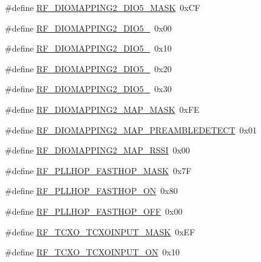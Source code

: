 \begin{DoxyCompactItemize}
\item 
\#define \hyperlink{sx1276Regs-Fsk_8h_a7f2fac07e30561cbe8a856d35592704e}{R\+F\+\_\+\+D\+I\+O\+M\+A\+P\+P\+I\+N\+G2\+\_\+\+D\+I\+O5\+\_\+\+M\+A\+SK}~0x\+CF
\item 
\#define \hyperlink{sx1276Regs-Fsk_8h_a49d9e03aef7b56e4772c7af5f55822b2}{R\+F\+\_\+\+D\+I\+O\+M\+A\+P\+P\+I\+N\+G2\+\_\+\+D\+I\+O5\+\_}~0x00
\item 
\#define \hyperlink{sx1276Regs-Fsk_8h_a3fa8da47f99319005e509c21a50e48b0}{R\+F\+\_\+\+D\+I\+O\+M\+A\+P\+P\+I\+N\+G2\+\_\+\+D\+I\+O5\+\_}~0x10
\item 
\#define \hyperlink{sx1276Regs-Fsk_8h_a259874b1f6f9963873c96de8b0bb6c30}{R\+F\+\_\+\+D\+I\+O\+M\+A\+P\+P\+I\+N\+G2\+\_\+\+D\+I\+O5\+\_}~0x20
\item 
\#define \hyperlink{sx1276Regs-Fsk_8h_ace7d0c4a788c6e13dd2ba438eb4ea344}{R\+F\+\_\+\+D\+I\+O\+M\+A\+P\+P\+I\+N\+G2\+\_\+\+D\+I\+O5\+\_}~0x30
\item 
\#define \hyperlink{sx1276Regs-Fsk_8h_aa2e45e0e210e6bb7c122982f17433ad4}{R\+F\+\_\+\+D\+I\+O\+M\+A\+P\+P\+I\+N\+G2\+\_\+\+M\+A\+P\+\_\+\+M\+A\+SK}~0x\+FE
\item 
\#define \hyperlink{sx1276Regs-Fsk_8h_a6a4137adde392024770632b94ce5b78a}{R\+F\+\_\+\+D\+I\+O\+M\+A\+P\+P\+I\+N\+G2\+\_\+\+M\+A\+P\+\_\+\+P\+R\+E\+A\+M\+B\+L\+E\+D\+E\+T\+E\+CT}~0x01
\item 
\#define \hyperlink{sx1276Regs-Fsk_8h_a6e81c871f9411523c67383b1accfac64}{R\+F\+\_\+\+D\+I\+O\+M\+A\+P\+P\+I\+N\+G2\+\_\+\+M\+A\+P\+\_\+\+R\+S\+SI}~0x00
\item 
\#define \hyperlink{sx1276Regs-Fsk_8h_a840e28ff315779d1bb03dbdde40d099b}{R\+F\+\_\+\+P\+L\+L\+H\+O\+P\+\_\+\+F\+A\+S\+T\+H\+O\+P\+\_\+\+M\+A\+SK}~0x7F
\item 
\#define \hyperlink{sx1276Regs-Fsk_8h_aca81d0d430dc3da63986cfec9c71419f}{R\+F\+\_\+\+P\+L\+L\+H\+O\+P\+\_\+\+F\+A\+S\+T\+H\+O\+P\+\_\+\+ON}~0x80
\item 
\#define \hyperlink{sx1276Regs-Fsk_8h_a212139c0fe426dc287805ec078162052}{R\+F\+\_\+\+P\+L\+L\+H\+O\+P\+\_\+\+F\+A\+S\+T\+H\+O\+P\+\_\+\+O\+FF}~0x00
\item 
\#define \hyperlink{sx1276Regs-Fsk_8h_aa006a0facb06e3841fd1b526a2e33a63}{R\+F\+\_\+\+T\+C\+X\+O\+\_\+\+T\+C\+X\+O\+I\+N\+P\+U\+T\+\_\+\+M\+A\+SK}~0x\+EF
\item 
\#define \hyperlink{sx1276Regs-Fsk_8h_a617bfeb60948f03de66b96101a3db22f}{R\+F\+\_\+\+T\+C\+X\+O\+\_\+\+T\+C\+X\+O\+I\+N\+P\+U\+T\+\_\+\+ON}~0x10
\item 

\end{DoxyCompactItemize}
